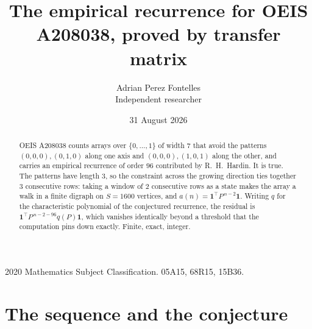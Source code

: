 \documentclass[11pt,a4paper]{article}
\title{The empirical recurrence for OEIS A208038, proved by transfer matrix}
\author{Adrian Perez Fontelles\\ \small Independent researcher}
\date{31 August 2026}
\theoremstyle{plain}
\theoremstyle{definition}
\begin{document}
\maketitle

\begin{abstract}
OEIS A208038 counts arrays over $\{0,\dots,1\}$ of width $7$ that avoid the patterns
$(0,0,0), (0,1,0)$ along one axis and $(0,0,0), (1,0,1)$ along the other, and carries an empirical recurrence of
order $96$ contributed by R.~H.~Hardin. It is true. The patterns have length $3$, so
the constraint across the growing direction ties together $3$ consecutive rows: taking a
window of $2$ consecutive rows as a state makes the array a walk in a finite digraph
on $S=1600$ vertices, and $a(n)=\mathbf{1}^{\!\top}P^{\,n-2}\mathbf{1}$. Writing $q$
for the characteristic polynomial of the conjectured recurrence, the residual is
$\mathbf{1}^{\!\top}P^{\,n-2-96}q(P)\mathbf{1}$, which vanishes identically
beyond a threshold that the computation pins down exactly. Finite, exact, integer.
\end{abstract}

\noindent\small 2020 Mathematics Subject Classification. 05A15, 68R15, 15B36.\normalsize

\section{The sequence and the conjecture}
\end{document}

